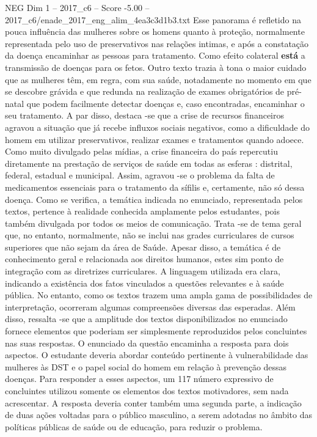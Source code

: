 \begin{textsample}{NEG Dim 1 – 2017\_c6 – Score -5.00 – 2017\_c6/enade\_2017\_eng\_alim\_4ea3c3d1b3.txt}
Esse panorama é refletido na pouca influência das mulheres sobre os homens quanto à proteção, normalmente representada pelo uso de preservativos nas relações intimas, e após a constatação da doença encaminhar as pessoas para tratamento.
Como efeito colateral \textbf{está} a transmissão de doenças para os fetos.
Outro texto trazia à tona o maior cuidado que as mulheres têm, em regra, com sua saúde, notadamente no momento em que se descobre grávida e que redunda na realização de exames obrigatórios de pré-natal que podem facilmente detectar doenças e, caso encontradas, encaminhar o seu tratamento.
A par disso, destaca -se que a crise de recursos financeiros agravou a situação que já recebe influxos sociais negativos, como a dificuldade do homem em utilizar preservativos, realizar exames e tratamentos quando adoece.
Como muito divulgado pelas mídias, a crise financeira do país repercutiu diretamente na prestação de serviços de saúde em todas as esferas : distrital, federal, estadual e municipal.
Assim, agravou -se o problema da falta de medicamentos essenciais para o tratamento da sífilis e, certamente, não só dessa doença.
Como se verifica, a temática indicada no enunciado, representada pelos textos, pertence à realidade conhecida amplamente pelos estudantes, pois também divulgada por todos os meios de comunicação.
Trata -se de tema geral que, no entanto, normalmente, não se inclui nas grades curriculares de cursos superiores que não sejam da área de Saúde.
Apesar disso, a temática é de conhecimento geral e relacionada aos direitos humanos, estes sim ponto de integração com as diretrizes curriculares.
A linguagem utilizada era clara, indicando a existência dos fatos vinculados a questões relevantes e à saúde pública.
No entanto, como os textos trazem uma ampla gama de possibilidades de interpretação, ocorreram algumas compreensões diversas das esperadas.
Além disso, ressalta -se que a amplitude dos textos disponibilizados no enunciado fornece elementos que poderiam ser simplesmente reproduzidos pelos concluintes nas suas respostas.
O enunciado da questão encaminha a resposta para dois aspectos.
O estudante deveria abordar conteúdo pertinente à vulnerabilidade das mulheres às DST e o papel social do homem em relação à prevenção dessas doenças.
Para responder a esses aspectos, um 117 número expressivo de concluintes utilizou somente os elementos dos textos motivadores, sem nada acrescentar.
A resposta deveria conter também uma segunda parte, a indicação de duas ações voltadas para o público masculino, a serem adotadas no âmbito das políticas públicas de saúde ou de educação, para reduzir o problema.

\end{textsample}
